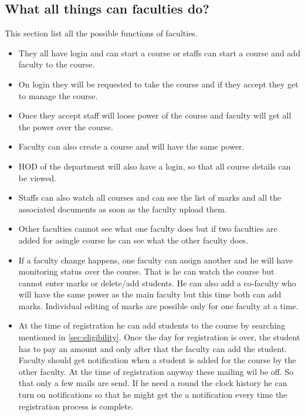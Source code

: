 \documentclass[a4paper,twoside]{article}
\begin{document}
\subsection{What all things can faculties do?}
This section list all the possible functions of faculties.
\begin{itemize}
\item They all have login and can start a course or staffs can start a course and add faculty to the course.
\item On login they will be requested to take the course and if they accept they get to manage the course. 
\item Once they accept staff will loose power of the course and faculty will get all the power over the course.
\item Faculty can also create a course and will have the same power. 
\item HOD of the department will also have a login, so that all course details can be viewed. 
\item Staffs can also watch all courses and can see the list of marks and all the associated documents as soon as the faculty upload them.
\item Other faculties cannot see what one faculty does but if two faculties are added for asingle course he can see what the other faculty does.
\item If a faculty change happens, one faculty can assign another and he will have monitoring status over the course. That is he can watch the course but cannot enter marks or delete/add students. He can also add a co-faculty who will have the same power as the main faculty but this time both can add marks. Individual editing of marks are possible only for one faculty at a time.
\item At the time of registration he can add students to the course by searching mentioned in \ref{sec:eligibility}. Once the day for registration is over, the student has to pay an amount and only after that the faculty can add the student. Faculty should get notification when a student is added for the course by the other faculty. At the time of registration anyway these mailing wil be off. So that only a few mails are send. If he need a round the clock history he can turn on notifications so that he might get the a notification every time the registration process is complete. 
\end{itemize}
\end{document}
